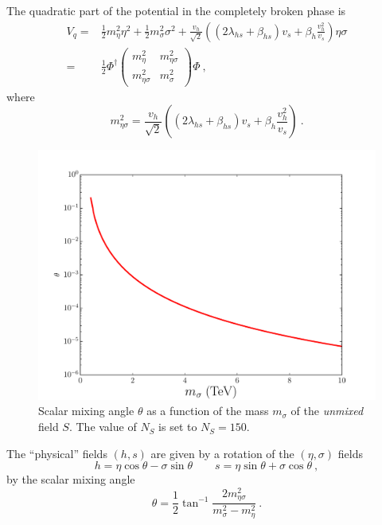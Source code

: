 \documentclass[aps,prd,preprintnumbers,nofootinbibn,twocolumn]{revtex4}
\begin{document}
The quadratic part of the potential in the completely broken phase is
\begin{align}
V_q =& \frac{1}{2} m_\eta^2 \eta^2  + \frac{1}{2} m_\sigma^2 \sigma^2 + \frac{v_h}{\sqrt{2}} \left((2\lambda_{hs} + \beta_{hs})v_s + \beta_h \frac{v_h^2}{v_s} \right) \eta \sigma \nonumber\\
=& \frac{1}{2} \Phi^\dagger \begin{pmatrix} m_\eta^2 & m_{\eta\sigma}^2\\ m_{\eta\sigma}^2  & m_\sigma^2 \end{pmatrix}\Phi\ ,
\end{align}
where
\begin{equation}
m_{\eta\sigma}^2 = \frac{v_h}{\sqrt{2}} \left((2\lambda_{hs} + \beta_{hs})v_s + \beta_h \frac{v_h^2}{v_s} \right)\ .
\end{equation}

\begin{figure}[t]
\centering
\includegraphics[width=\columnwidth]{angle}
\caption{Scalar mixing angle $\theta$ as a function of the mass $m_\sigma$ of the \textit{unmixed} field $S$. The value of $N_S$ is set to $N_S=150$.}\label{fig:angle}
\end{figure}

The ``physical'' fields $(h, s)$ are given by a rotation of the $(\eta, \sigma)$ fields
\begin{equation}
h = \eta \cos \theta - \sigma \sin \theta \qquad s = \eta \sin \theta + \sigma \cos \theta\ ,
\end{equation}
by the scalar mixing angle
\begin{equation}
\theta = \frac{1}{2} \tan^{-1} \frac{2m_{\eta\sigma}^2}{m_\sigma^2 - m_\eta^2}\ .
\end{equation}
\end{document}
